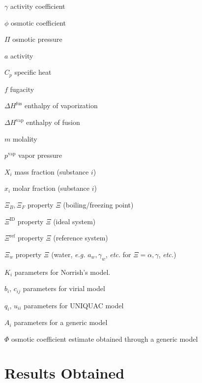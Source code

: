 \documentclass[
	12pt,				%
	openright,
	twoside,
	a4paper,			%
	brazil,			%
	french,				%
	english				%
	]{abntex2}
\begin{document}
\begin{simbolos}
	\item[$ \gamma $] activity coefficient
	\item[$ \phi $] osmotic coefficient
	\item[$ \Pi $] osmotic pressure
	\item[$ a $] activity
	\item[$ C_p $] specific heat
	\item[$ f $] fugacity
	\item[$ \Delta H^\text{fus} $] enthalpy of vaporization
	\item[$ \Delta H^\text{vap} $] enthalpy of fusion
	\item[$ m $] molality
	\item[$ p^\text{vap} $] vapor pressure
	\item[$ X_i $] mass fraction (substance $i$)
	\item[$ x_i $] molar fraction (substance $i$)
	\item[$ \Xi_B, \Xi_F $] property $\Xi$ (boiling/freezing point)
	\item[$ \Xi^\text{ID} $] property $\Xi$ (ideal system)
	\item[$ \Xi^\text{ref} $] property $\Xi$ (reference system)
	\item[$ \Xi_w $] property $\Xi$ (water, \textit{e.g.} $a_w, %
		\gamma_w$, \textit{etc.} %
		for $\Xi = \alpha, \gamma$, \textit{etc.})
	\item[$K_i$] parameters for Norrish's model.
	\item[$b_i$, $c_{ij}$] parameters for virial model
	\item[$q_i$, $u_{ii}$] parameters for UNIQUAC model
	\item[$A_i$] parameters for a generic model
	\item[$\Phi$] osmotic coefficient estimate obtained through a generic model
\end{simbolos}

\tableofcontents*
\cleardoublepage

\textual







\part{Results Obtained}









\postextual

\nocite{nocedal2006}


\begin{anexosenv}



\end{anexosenv}

\printindex
\end{document}

